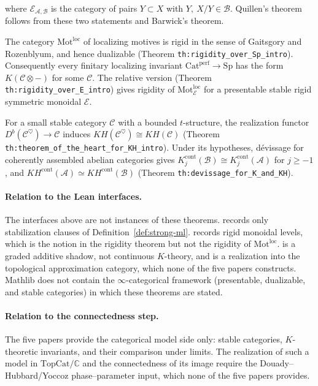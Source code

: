 \begin{description}
where $\mathcal E_{\mathcal A,\mathcal B}$ is the category of pairs $Y\subset X$ with $Y,\ X/Y\in\mathcal B$.
Quillen's theorem follows from these two statements and Barwick's theorem.
\item[Rigidity of localizing motives~\cite{EfimovRigidityMot}, introduction.]
The category $\mathrm{Mot}^{\mathrm{loc}}$ of localizing motives is rigid in the sense of Gaitsgory and
Rozenblyum, and hence dualizable (Theorem \texttt{th:rigidity\_over\_Sp\_intro}).  Consequently every
finitary localizing invariant $\mathrm{Cat}^{\mathrm{perf}}\to\mathrm{Sp}$ has the form $K(\mathcal C\otimes-)$
for some $\mathcal C$.  The relative version (Theorem \texttt{th:rigidity\_over\_E\_intro}) gives rigidity
of $\mathrm{Mot}^{\mathrm{loc}}_{\mathcal E}$ for a presentable stable rigid symmetric monoidal $\mathcal E$.
\item[Theorem of the heart for $KH$~\cite{EfimovHeartKH}, lines 530--551 and 2803--2804, 3017--3026.]
For a small stable category $\mathcal C$ with a bounded $t$-structure, the realization functor
$D^b(\mathcal C^\heartsuit)\to\mathcal C$ induces $KH(\mathcal C^\heartsuit)\cong KH(\mathcal C)$
(Theorem \texttt{th:theorem\_of\_the\_heart\_for\_KH\_intro}).  Under its hypotheses, dévissage for
coherently assembled abelian categories gives $K^{\mathrm{cont}}_j(\mathcal B)\cong K^{\mathrm{cont}}_j(\mathcal A)$
for $j\ge-1$, and $KH^{\mathrm{cont}}(\mathcal A)\simeq KH^{\mathrm{cont}}(\mathcal B)$
(Theorem \texttt{th:devissage\_for\_K\_and\_KH}).
\end{description}

\paragraph{Relation to the Lean interfaces.}
The  interfaces above are not instances of these theorems.
 records only stabilization clauses of
Definition~\ref{def:strong-ml}.   records rigid monoidal levels,
which is the notion in the rigidity theorem but not the rigidity of $\mathrm{Mot}^{\mathrm{loc}}$.
 is a graded additive shadow, not continuous $K$-theory, and
 is a realization into the topological approximation category, which
none of the five papers constructs.  Mathlib does not contain the $\infty$-categorical framework
(presentable, dualizable, and stable categories) in which these theorems are stated.

\paragraph{Relation to the connectedness step.}
The five papers provide the categorical model side only: stable categories, $K$-theoretic invariants,
and their comparison under limits.  The realization of such a model in $\mathrm{TopCat}/\mathbb C$ and
the connectedness of its image require the Douady--Hubbard/Yoccoz phase--parameter input, which none
of the five papers provides.

